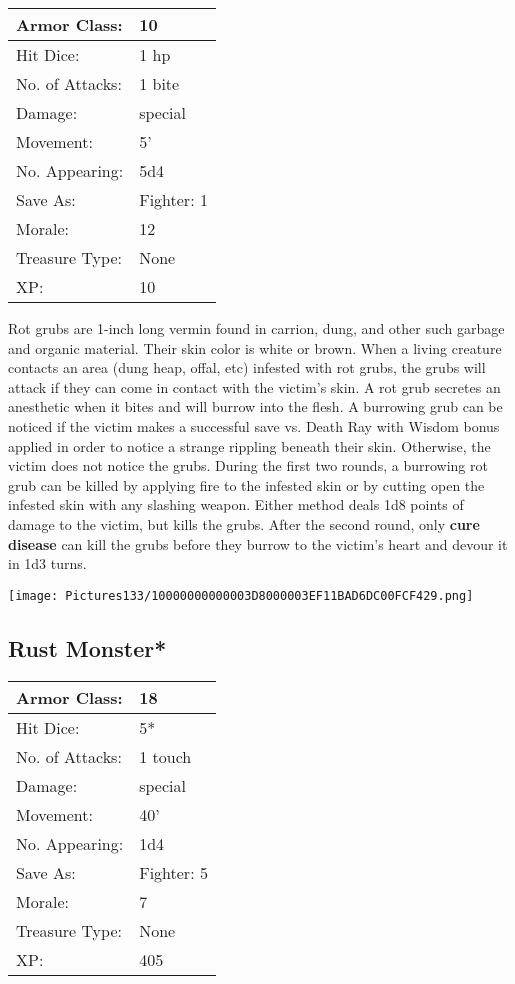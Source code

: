 \documentclass[a4paper,twoside,openany,10pt]{book}
\begin{document}
\begin{multicols}{2}
\begin{tabularx}{0.50\textwidth}{@{}lX@{}}
Armor Class: & 10 \\\hline
Hit Dice: & 1 hp \\\hline
No. of Attacks: & 1 bite \\\hline
Damage: & special \\\hline
Movement: & 5' \\\hline
No. Appearing: & 5d4 \\\hline
Save As: & Fighter: 1 \\\hline
Morale: & 12 \\\hline
Treasure Type: & None \\\hline
XP: & 10 \\\hline
\end{tabularx}\medskip

Rot grubs are 1-inch long vermin found in carrion, dung, and other such garbage and organic material. Their skin color is white or brown. When a living creature contacts an area (dung heap, offal, etc) infested with rot grubs, the grubs will attack if they can come in contact with the victim's skin. A rot grub secretes an anesthetic when it bites and will burrow into the flesh. A burrowing grub can be noticed if the victim makes a successful save vs. Death Ray with Wisdom bonus applied in order to notice a strange rippling beneath their skin. Otherwise, the victim does not notice the grubs. During the first two rounds, a burrowing rot grub can be killed by applying fire to the infested skin or by cutting open the infested skin with any slashing weapon. Either method deals 1d8 points of damage to the victim, but kills the grubs. After the second round, only \textbf{cure disease} can kill the grubs before they burrow to the victim's heart and devour it in 1d3 turns.

\begin{center} \texttt{[image: Pictures133/10000000000003D8000003EF11BAD6DC00FCF429.png]} \end{center}


\subsection*{Rust Monster*}\label{rust-monster}

\begin{tabularx}{0.50\textwidth}{@{}lX@{}}
Armor Class: & 18 \\\hline
Hit Dice: & 5* \\\hline
No. of Attacks: & 1 touch \\\hline
Damage: & special \\\hline
Movement: & 40' \\\hline
No. Appearing: & 1d4 \\\hline
Save As: & Fighter: 5 \\\hline
Morale: & 7 \\\hline
Treasure Type: & None \\\hline
XP: & 405 \\\hline
\end{tabularx}\medskip


\end{multicols}
\end{document}
